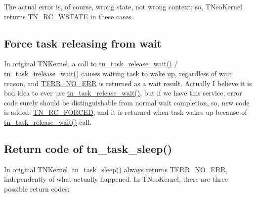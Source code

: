 The actual error is, of course, wrong state, not wrong context; so, T\+Neo\+Kernel returns {\ttfamily \hyperlink{tn__common_8h_aa43bd3da1ad4c1e61224b5f23b369876a7b6d93374f52ba4b2fc01b38b783aa4c}{T\+N\+\_\+\+R\+C\+\_\+\+W\+S\+T\+A\+T\+E}} in these cases.\hypertarget{tnkernel_diff_tnkernel_diff_release_wait}{}\subsection{Force task releasing from wait}\label{tnkernel_diff_tnkernel_diff_release_wait}
In original T\+N\+Kernel, a call to {\ttfamily \hyperlink{tn__tasks_8h_ae90ecdbd7d87d050c2c98ec775e6efc7}{tn\+\_\+task\+\_\+release\+\_\+wait()}} / {\ttfamily \hyperlink{tn__tasks_8h_aee0ef296af18733f64269386adf8a2d7}{tn\+\_\+task\+\_\+irelease\+\_\+wait()}} causes waiting task to wake up, regardless of wait reason, and {\ttfamily \hyperlink{tn__oldsymbols_8h_a71970f860643e62fad7ec03076bdc1d8}{T\+E\+R\+R\+\_\+\+N\+O\+\_\+\+E\+R\+R}} is returned as a wait result. Actually I believe it is bad idea to ever use {\ttfamily \hyperlink{tn__tasks_8h_ae90ecdbd7d87d050c2c98ec775e6efc7}{tn\+\_\+task\+\_\+release\+\_\+wait()}}, but if we have this service, error code surely should be distinguishable from normal wait completion, so, new code is added\+: {\ttfamily \hyperlink{tn__common_8h_aa43bd3da1ad4c1e61224b5f23b369876ae5cbacb0fb01805c9003046c08bf4356}{T\+N\+\_\+\+R\+C\+\_\+\+F\+O\+R\+C\+E\+D}}, and it is returned when task wakes up because of {\ttfamily \hyperlink{tn__tasks_8h_ae90ecdbd7d87d050c2c98ec775e6efc7}{tn\+\_\+task\+\_\+release\+\_\+wait()}} call.\hypertarget{tnkernel_diff_tnkernel_diff_task_sleep}{}\subsection{Return code of tn\+\_\+task\+\_\+sleep()}\label{tnkernel_diff_tnkernel_diff_task_sleep}
In original T\+N\+Kernel, {\ttfamily \hyperlink{tn__tasks_8h_ad3708ae3400f11b98747ad4a1cad88fa}{tn\+\_\+task\+\_\+sleep()}} always returns {\ttfamily \hyperlink{tn__oldsymbols_8h_a71970f860643e62fad7ec03076bdc1d8}{T\+E\+R\+R\+\_\+\+N\+O\+\_\+\+E\+R\+R}}, independently of what actually happened. In T\+Neo\+Kernel, there are three possible return codes\+:


